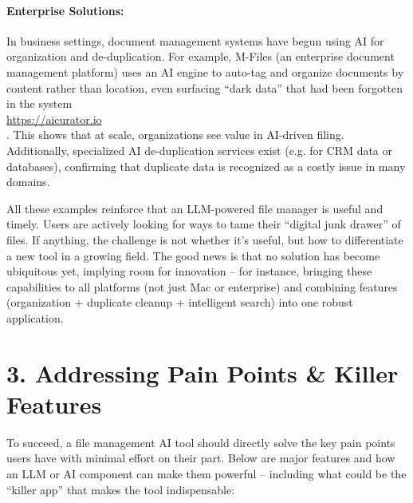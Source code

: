 \documentclass[11pt]{article}
\begin{document}
\paragraph{Enterprise Solutions:} In business settings, document management systems have begun using AI for organization and de-duplication. For example, M-Files (an enterprise document management platform) uses an AI engine to auto-tag and organize documents by content rather than location, even surfacing “dark data” that had been forgotten in the system \\ \url{https://aicurator.io} \\ . This shows that at scale, organizations see value in AI-driven filing. Additionally, specialized AI de-duplication services exist (e.g. for CRM data or databases), confirming that duplicate data is recognized as a costly issue in many domains.

All these examples reinforce that an LLM-powered file manager is useful and timely. Users are actively looking for ways to tame their “digital junk drawer” of files. If anything, the challenge is not whether it’s useful, but how to differentiate a new tool in a growing field. The good news is that no solution has become ubiquitous yet, implying room for innovation -- for instance, bringing these capabilities to all platforms (not just Mac or enterprise) and combining features (organization + duplicate cleanup + intelligent search) into one robust application.

\section{3. Addressing Pain Points \& Killer Features}
To succeed, a file management AI tool should directly solve the key pain points users have with minimal effort on their part. Below are major features and how an LLM or AI component can make them powerful -- including what could be the “killer app” that makes the tool indispensable:
\end{document}
